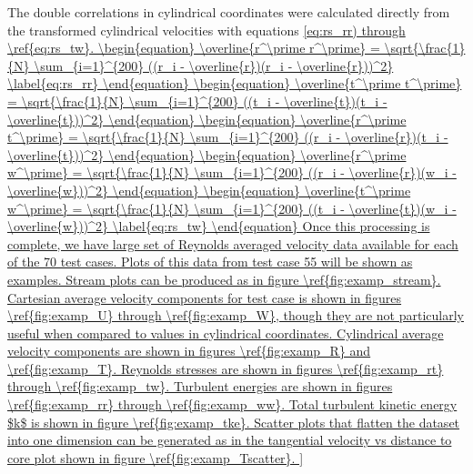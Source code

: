 The double correlations in cylindrical coordinates were calculated directly 
from the transformed cylindrical velocities with equations \ref{eq:rs_rr) 
through \ref{eq:rs_tw}.
	
\begin{equation}
\overline{r^\prime r^\prime} = \sqrt{\frac{1}{N} \sum_{i=1}^{200} 
	((r_i - \overline{r})(r_i - \overline{r}))^2}
\label{eq:rs_rr}
\end{equation}

\begin{equation}
\overline{t^\prime t^\prime} = \sqrt{\frac{1}{N} \sum_{i=1}^{200} 
	((t_i - \overline{t})(t_i - \overline{t}))^2}
\end{equation}

\begin{equation}
\overline{r^\prime t^\prime} = \sqrt{\frac{1}{N} \sum_{i=1}^{200} 
	((r_i - \overline{r})(t_i - \overline{t}))^2}
\end{equation}

\begin{equation}
\overline{r^\prime w^\prime} = \sqrt{\frac{1}{N} \sum_{i=1}^{200} 
	((r_i - \overline{r})(w_i - \overline{w}))^2}
\end{equation}

\begin{equation}
\overline{t^\prime w^\prime} = \sqrt{\frac{1}{N} \sum_{i=1}^{200} 
	((t_i - \overline{t})(w_i - \overline{w}))^2}
\label{eq:rs_tw}
\end{equation}

	
Once this processing is complete, we have large set of Reynolds averaged 
velocity data available for each of the 70 test cases. Plots of this data from 
test case 55 will be shown as examples. Stream plots can be produced as in 
figure \ref{fig:examp_stream}. Cartesian average velocity components for test 
case is shown in figures \ref{fig:examp_U} through \ref{fig:examp_W}, though 
they are not particularly useful when compared to values in cylindrical 
coordinates. 
Cylindrical average velocity components are shown in figures \ref{fig:examp_R} 
and \ref{fig:examp_T}. Reynolds stresses are shown in figures 
\ref{fig:examp_rt} through \ref{fig:examp_tw}. Turbulent energies are shown in 
figures \ref{fig:examp_rr} through \ref{fig:examp_ww}. Total turbulent kinetic 
energy $k$ is shown in figure \ref{fig:examp_tke}. Scatter plots that 
flatten the dataset into one dimension can be generated as in the tangential 
velocity vs distance to core plot shown in figure \ref{fig:examp_Tscatter}. 

}
